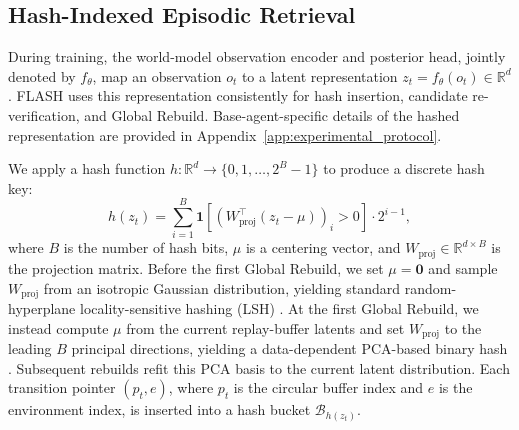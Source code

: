 \documentclass{article} %
\begin{document}
\subsection{Hash-Indexed Episodic Retrieval}
\label{subsec:flash_memory}

During training, the world-model observation encoder and posterior head, jointly denoted by $f_\theta$, map an observation $o_t$ to a latent representation $z_t=f_\theta(o_t)\in\mathbb{R}^d$. FLASH uses this representation consistently for hash insertion, candidate re-verification, and Global Rebuild. Base-agent-specific details of the hashed representation are provided in Appendix~\ref{app:experimental_protocol}.

We apply a hash function $h: \mathbb{R}^d \to \{0,1,\ldots,2^B{-}1\}$ to produce a discrete hash key:
\begin{equation}
h(z_t) = \sum_{i=1}^{B} \mathbf{1}\!\left[\left(W_{\text{proj}}^\top (z_t - \mu)\right)_i > 0\right] \cdot 2^{i-1},
\label{eq:lsh}
\end{equation}
where $B$ is the number of hash bits, $\mu$ is a centering vector, and $W_{\text{proj}} \in \mathbb{R}^{d \times B}$ is the projection matrix. Before the first Global Rebuild, we set $\mu=\mathbf{0}$ and sample $W_{\text{proj}}$ from an isotropic Gaussian distribution, yielding standard random-hyperplane locality-sensitive hashing (LSH) \citep{charikar2002similarity}. At the first Global Rebuild, we instead compute $\mu$ from the current replay-buffer latents and set $W_{\text{proj}}$ to the leading $B$ principal directions, yielding a data-dependent PCA-based binary hash \citep{lin2010spec}. Subsequent rebuilds refit this PCA basis to the current latent distribution.
Each transition pointer $(p_t, e)$, where $p_t$ is the circular buffer index and $e$ is the environment index, is inserted into a hash bucket $\mathcal{B}_{h(z_t)}$.
\end{document}
